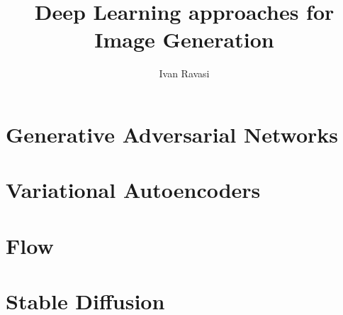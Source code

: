 \documentclass{beamer}
\title[Image generation through DL]{Deep Learning approaches for Image Generation}
\author[I. Ravasi]{Ivan Ravasi}
\begin{document}
    \frame{\titlepage}
    \section{Generative Adversarial Networks}
    
    \section{Variational Autoencoders}
    \section{Flow}
    \section{Stable Diffusion}
    
\end{document}
